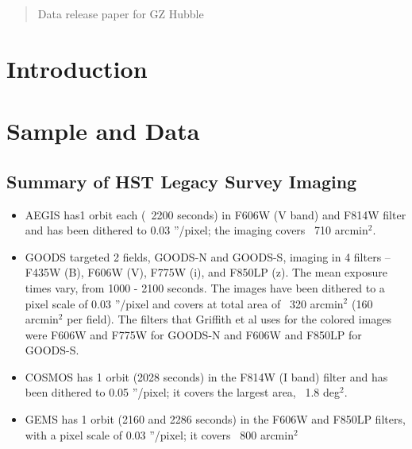 \documentclass[usenatbib]{mn2e}
\begin{document}
\maketitle

\begin{abstract}

Data release paper for GZ Hubble

\end{abstract}


\section{Introduction}


\section{Sample and Data} 

\subsection{Summary of HST Legacy Survey Imaging}

\begin{itemize}
\item AEGIS has1 orbit each (~2200 seconds) in F606W (V band) and F814W filter and has been dithered to 0.03 ''/pixel; the imaging covers ~710 arcmin$^2$.

\item GOODS targeted 2 fields, GOODS-N and GOODS-S, imaging in 4 filters -- F435W (B), F606W (V), F775W (i), and F850LP (z). The mean exposure times vary, from 1000 - 2100 seconds. The images have been dithered to a pixel scale of 0.03 ''/pixel and covers at total area of ~320 arcmin$^2$ (160 arcmin$^2$ per field). The filters that Griffith et al uses for the colored images were F606W and F775W for GOODS-N and F606W and F850LP for GOODS-S.

\item COSMOS has 1 orbit (2028 seconds) in the F814W (I band) filter and has been dithered to 0.05 ''/pixel; it covers the largest area, ~1.8 deg$^2$. 

\item GEMS has 1 orbit (2160 and 2286 seconds) in the F606W and F850LP filters, with a pixel scale of 0.03 ''/pixel; it covers ~800 arcmin$^2$
\end{itemize}
\end{document}
